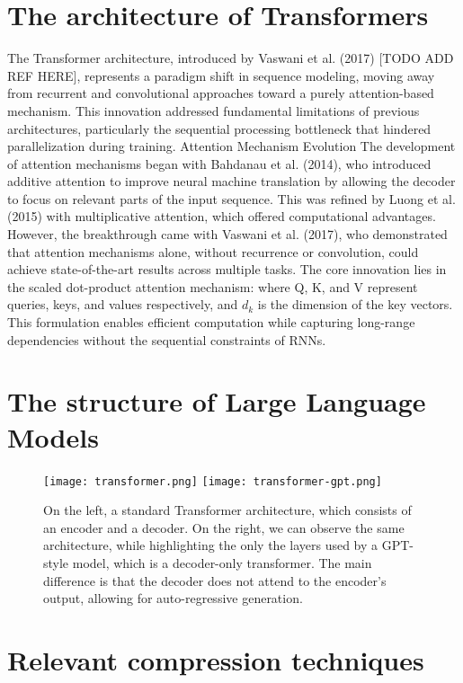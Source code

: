 \section{The architecture of Transformers} \label{transformer_architecture}
The Transformer architecture, introduced by Vaswani et al. (2017) [TODO ADD REF HERE], represents a paradigm shift in sequence modeling, moving away from recurrent and convolutional approaches toward a purely attention-based mechanism. This innovation addressed fundamental limitations of previous architectures, particularly the sequential processing bottleneck that hindered parallelization during training.
Attention Mechanism Evolution
The development of attention mechanisms began with Bahdanau et al. (2014), who introduced additive attention to improve neural machine translation by allowing the decoder to focus on relevant parts of the input sequence. This was refined by Luong et al. (2015) with multiplicative attention, which offered computational advantages. However, the breakthrough came with Vaswani et al. (2017), who demonstrated that attention mechanisms alone, without recurrence or convolution, could achieve state-of-the-art results across multiple tasks.
The core innovation lies in the scaled dot-product attention mechanism:
where Q, K, and V represent queries, keys, and values respectively, and $d_{k}$ is the dimension of the key vectors. This formulation enables efficient computation while capturing long-range dependencies without the sequential constraints of RNNs.

\section{The structure of Large Language Models}

\begin{figure}[htbp]
    \centering
    \texttt{[image: transformer.png]}
    \hfill
    \texttt{[image: transformer-gpt.png]}
    \caption{On the left, a standard Transformer architecture, which consists of an encoder and a decoder. On the right, we can observe the same architecture, while highlighting the only the layers used by a GPT-style model, which is a decoder-only transformer. The main difference is that the decoder does not attend to the encoder's output, allowing for auto-regressive generation.}
    \label{fig:sidebyside}
\end{figure}

\section{Relevant compression techniques}


